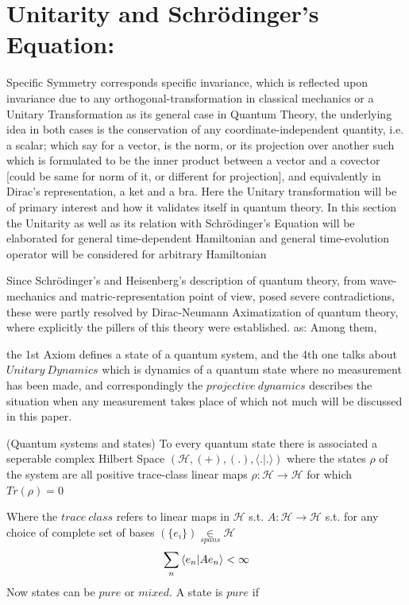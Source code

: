 \documentclass[8pt, twocoloumn]{article}
\begin{document}
\section{Unitarity and Schrödinger's Equation: }
Specific Symmetry corresponds specific invariance, which is reflected upon invariance due to any orthogonal-transformation in classical mechanics or a Unitary Transformation as its general case in Quantum Theory, the underlying idea in both cases is the conservation of any coordinate-independent quantity, i.e. a scalar; which say for a vector, is the norm, or its projection over another such which is formulated to be the inner product between a vector and a covector [could be same for norm of it, or different for projection], and equivalently in Dirac's representation, a ket and a bra. Here the Unitary transformation will be of primary interest and how it validates itself in quantum theory. In this section the Unitarity as well as its relation with Schrödinger's Equation will be elaborated for general time-dependent Hamiltonian and general time-evolution operator will be considered for arbitrary Hamiltonian

Since Schrödinger's and Heisenberg's description of quantum theory, from wave-mechanics and matric-representation point of view, posed severe contradictions, these were partly resolved by Dirac-Neumann Aximatization of quantum theory, where explicitly the pillers of this theory were established. \cite{schuller} as:
Among them, 

the 1st Axiom defines a state of a quantum system, and the 4th one talks about $Unitary \ Dynamics$ which is dynamics of a quantum state where no measurement has been made, and correspondingly the $projective \ dynamics$ describes the situation when any measurement takes place of which not much will be discussed in this paper. 

\begin{axiom1}{\label{axiom1: axiom1}}
(Quantum systems and states) To every quantum state there is associated a seperable complex Hilbert Space $(\mathcal{H}, (+), (.) , \langle . | . \rangle )$ where the states $\rho$ of the system are all positive trace-class linear maps $\rho : \mathcal{H} \to \mathcal{H}$ for which $Tr(\rho)=0$
\end{axiom1}

Where the $trace \ class$ refers to linear maps in $\mathcal{H}$ s.t. $A : \mathcal{H} \to \mathcal{H}$ s.t. for any choice of complete set of bases $(\{e_i\}) \underset{spans}{\in} \mathcal{H}$ $$\sum_{n} \braket{e_n| Ae_n} < \infty$$
Now states can be  $pure$ or $mixed$. A state is $pure$ if 
\end{document}
